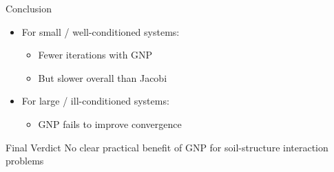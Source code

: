 \documentclass[aspectratio=169]{beamer}
\begin{document}

\begin{frame}{Conclusion}
	\begin{itemize}
		\item For small / well-conditioned systems:
		\begin{itemize}
			\item Fewer iterations with GNP
			\item But slower overall than Jacobi
		\end{itemize}
		
		\medskip
		
		\item For large / ill-conditioned systems:
		\begin{itemize}
			\item GNP fails to improve convergence
		\end{itemize}
	\end{itemize}
	
	\medskip
	
	\begin{block}{Final Verdict}
		No clear practical benefit of GNP for soil-structure interaction problems
	\end{block}
	

\end{frame}


\begin{frame}
	\printbibliography
\end{frame}
\end{document}
